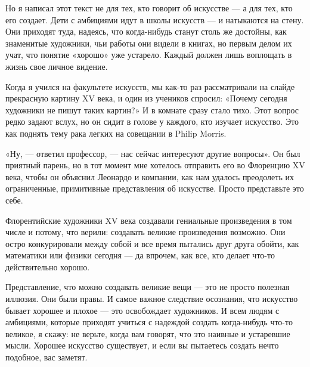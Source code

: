 \documentclass[ebook,12pt,oneside,openany]{memoir}
\begin{document}
Но я написал этот текст не для тех, кто говорит об искусстве — а для
тех, кто его создает. Дети с амбициями идут в школы искусств — и
натыкаются на стену. Они приходят туда, надеясь, что когда-нибудь
станут столь же достойны, как знаменитые художники, чьи работы они
видели в книгах, но первым делом их учат, что понятие «хорошо» уже
устарело. Каждый должен лишь воплощать в жизнь свое личное видение. \newline

Когда я учился на факультете искусств, мы как-то раз рассматривали на
слайде прекрасную картину XV века, и один из учеников спросил: «Почему
сегодня художники не пишут таких картин?» И в комнате сразу стало
тихо. Этот вопрос редко задают вслух, но он сидит в голове у каждого,
кто изучает искусство. Это как поднять тему рака легких на совещании в
Philip Morris. \newline

«Ну, — ответил профессор, — нас сейчас интересуют другие вопросы». Он
был приятный парень, но в тот момент мне хотелось отправить его во
Флоренцию XV века, чтобы он объяснил Леонардо и компании, как нам
удалось преодолеть их ограниченные, примитивные представления об
искусстве. Просто представьте это себе. \newline

Флорентийские художники XV века создавали гениальные произведения в
том числе и потому, что верили: создавать великие произведения
возможно. Они остро конкурировали между собой и все время пытались
друг друга обойти, как математики или физики сегодня — да впрочем, как
все, кто делает что-то действительно хорошо. \newline

Представление, что можно создавать великие вещи — это не просто
полезная иллюзия. Они были правы. И самое важное следствие осознания,
что искусство бывает хорошее и плохое — это освобождает художников. И
всем людям с амбициями, которые приходят учиться с надеждой создать
когда-нибудь что-то великое, я скажу: не верьте, когда вам говорят,
что это наивные и устаревшие мысли. Хорошее искусство существует, и
если вы пытаетесь создать нечто подобное, вас заметят.
\end{document}
